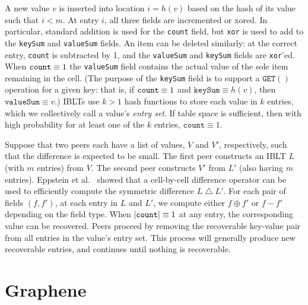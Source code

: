   A new value $v$ is inserted into location $i=h(v)$ based on
the hash of its value such that $i < m$.  At entry $i$, all three
fields are incremented or xored. In particular, standard
addition is used for the \texttt{count} field, but \texttt{xor} is
used to add to the \texttt{keySum} and \texttt{valueSum} fields. An
item can be deleted similarly: at the correct entry, \texttt{count}
is subtracted by 1, and the \texttt{valueSum} and \texttt{keySum}
fields are \texttt{xor}'ed.  When $\mbox{\texttt{count}} \equiv 1$
the \texttt{valueSum} field contains the actual value of the sole
item remaining in the cell.  (The purpose of the \texttt{keySum}
field is to support a $\texttt{GET}()$ operation for a given
key: that is, if $\mbox{\texttt{count}} \equiv 1$ and
$\texttt{keySum} \equiv h(v)$, then
$\texttt{valueSum} \equiv v$.)
IBLTs use $k > 1$ hash functions to store each value in $k$ entries, which we collectively call a value's \emph{entry set}.  
If table space is sufficient, then with high probability for at least one of the $k$
entries, $\texttt{count} \equiv 1$.

Suppose that two peers each have a list of values, $V$ and $V'$,
respectively, such that the difference is expected to be small.  The
first peer constructs an IBLT $L$ (with $m$ entries) from $V$.  The
second peer constructs $V'$ from $L'$ (also having $m$ entries).
Eppstein et al.~\cite{eppstein:2011} showed that a cell-by-cell
difference operator can be used to efficiently compute the symmetric
difference $L \bigtriangleup L'$.  For each pair of fields $(f, f')$,
at each entry in $L$ and $L'$, we compute either $f \oplus f'$ or
\mbox{$f - f'$} depending on the field type.  When
$|\mbox{\texttt{count}}| \equiv 1$ at any entry, the corresponding
value can be recovered.  
  Peers proceed by removing the recoverable key-value pair from all entries in the value's entry set.
This process will generally produce new recoverable entries, and
continues until nothing is recoverable.
 
\section{Graphene}


